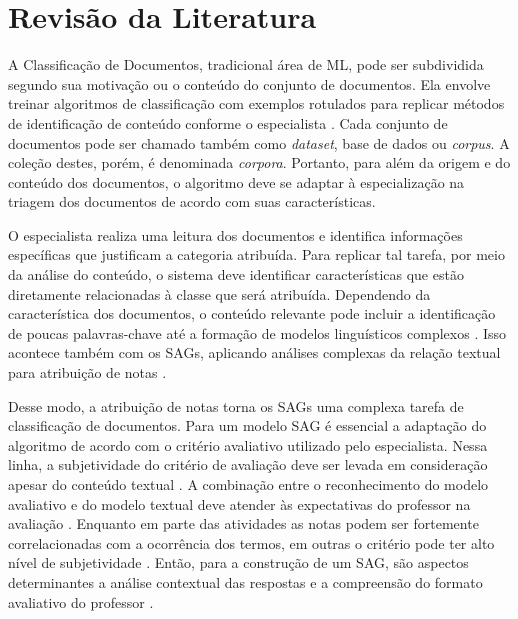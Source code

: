 \chapter{Revisão da Literatura}
\label{cap-literatura}


A Classificação de Documentos, tradicional área de ML, pode ser subdividida segundo sua motivação ou o conteúdo do conjunto de documentos. Ela envolve treinar algoritmos de classificação com exemplos rotulados para replicar métodos de identificação de conteúdo conforme o especialista \cite{baeza2011}. Cada conjunto de documentos pode ser chamado também como \textit{dataset}, base de dados ou \textit{corpus}. A coleção destes, porém, é denominada \textit{corpora}. Portanto, para além da origem e do conteúdo dos documentos, o algoritmo deve se adaptar à especialização na triagem dos documentos de acordo com suas características.

O especialista realiza uma leitura dos documentos e identifica informações específicas que justificam a categoria atribuída. Para replicar tal tarefa, por meio da análise do conteúdo, o sistema deve identificar características que estão diretamente relacionadas à classe que será atribuída. Dependendo da característica dos documentos, o conteúdo relevante pode incluir a identificação de poucas palavras-chave até a formação de modelos linguísticos complexos \cite{jurafsky2009}. Isso acontece também com os SAGs, aplicando análises complexas da relação textual para atribuição de notas \cite{paiva2012, yang2021}.

Desse modo, a atribuição de notas torna os SAGs uma complexa tarefa de classificação de documentos. Para um modelo SAG é essencial a adaptação do algoritmo de acordo com o critério avaliativo utilizado pelo especialista. Nessa linha, a subjetividade do critério de avaliação deve ser levada em consideração apesar do conteúdo textual \cite{pado2021}. A combinação entre o reconhecimento do modelo avaliativo e do modelo textual deve atender às expectativas do professor na avaliação \cite{condor2020}. Enquanto em parte das atividades as notas podem ser fortemente correlacionadas com a ocorrência dos termos, em outras o critério pode ter alto nível de subjetividade \cite{azad2020}. Então, para a construção de um SAG, são aspectos determinantes a análise contextual das respostas e a compreensão do formato avaliativo do professor \cite{mohler2011}.

